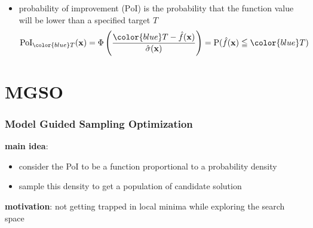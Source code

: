 \documentclass[sans,mathserif]{beamer}
\newcommand{\xx}{\mathrm{\mathbf{x}}}
\newcommand{\blue}[1]{{\color{blue} #1}}
\begin{document}
\begin{frame}
\begin{columns}[T]
{\begin{figure}
      \end{figure}
    }
  \end{columns}
  \begin{itemize}
    \item<2-> \alert{probability of improvement} ($\mathrm{PoI}$) is the probability that the function value will be lower than a specified \blue{target $T$}
      \begin{displaymath}
        \mathrm{PoI}_\blue{T}(\xx) = \Phi \left( \frac{\blue{T} - \hat{f}(\xx)}{\hat{\sigma}(\xx)} \right) = \mathrm{P}(\hat{f}(\xx) \leqq \blue{T})
      \end{displaymath}
  \end{itemize}
\end{frame}


\section{MGSO}

\begin{frame}
  \frametitle{Model Guided Sampling Optimization}
  \textbf{main idea}:
  \begin{itemize}
    \item consider the PoI to be a function proportional to a probability density
    \item sample this density to get a population of candidate solution
  \end{itemize}
  \textbf{motivation}: not getting trapped in local minima while exploring the search space
\end{frame}
\end{document}
